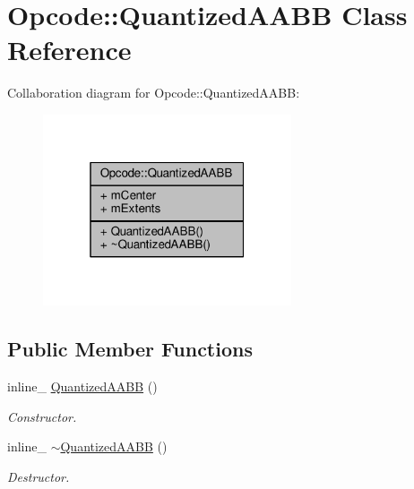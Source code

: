 \hypertarget{classOpcode_1_1QuantizedAABB}{}\section{Opcode\+:\+:Quantized\+A\+A\+BB Class Reference}
\label{classOpcode_1_1QuantizedAABB}


Collaboration diagram for Opcode\+:\+:Quantized\+A\+A\+BB\+:
\nopagebreak
\begin{figure}[H]
\begin{center}
\leavevmode
\includegraphics[width=208pt]{db/dea/classOpcode_1_1QuantizedAABB__coll__graph}
\end{center}
\end{figure}
\subsection*{Public Member Functions}
\begin{DoxyCompactItemize}
\item 
inline\+\_\+ \hyperlink{classOpcode_1_1QuantizedAABB_a3545017931b161f2be28fc06f265ad63}{Quantized\+A\+A\+BB} ()\hypertarget{classOpcode_1_1QuantizedAABB_a3545017931b161f2be28fc06f265ad63}{}\label{classOpcode_1_1QuantizedAABB_a3545017931b161f2be28fc06f265ad63}

\begin{DoxyCompactList}\small\item\em Constructor. \end{DoxyCompactList}\item 
inline\+\_\+ \hyperlink{classOpcode_1_1QuantizedAABB_ac564b5cabcb205a85b18c539f8c287ef}{$\sim$\+Quantized\+A\+A\+BB} ()\hypertarget{classOpcode_1_1QuantizedAABB_ac564b5cabcb205a85b18c539f8c287ef}{}\label{classOpcode_1_1QuantizedAABB_ac564b5cabcb205a85b18c539f8c287ef}

\begin{DoxyCompactList}\small\item\em Destructor. \end{DoxyCompactList}\end{DoxyCompactItemize}
